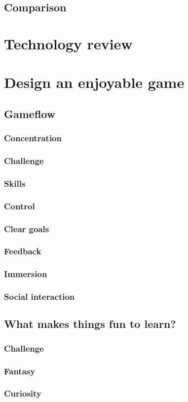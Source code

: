 \documentclass[../Main.tex]{subfiles}
\begin{document}
    \subsection{Comparison}

\section{Technology review}

\section{Design an enjoyable game}
    \subsection{Gameflow}
        \citep{malone_what_1980, sweetser_gameflow_2005}
        \subsubsection{Concentration}
        \subsubsection{Challenge}
        \subsubsection{Skills}
        \subsubsection{Control}
        \subsubsection{Clear goals}
        \subsubsection{Feedback}
        \subsubsection{Immersion}
        \subsubsection{Social interaction}
    \subsection{What makes things fun to learn?}
        \subsubsection{Challenge}
        \subsubsection{Fantasy}
        \subsubsection{Curiosity}

\biblio %
\end{document}
